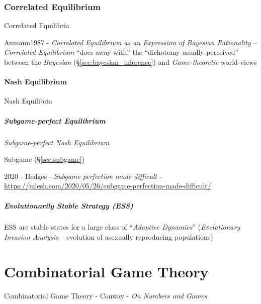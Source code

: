 \subsubsection{Correlated Equilibrium}\label{sec:correlated_equilibrium}

Correlated Equilibria

Aumann1987 - \emph{Correlated Equilibrium as an Expression of Bayesian
  Rationality} -- \emph{Correlated Equilibrium} ``does away with'' the
``dichotomy usually perceived'' between the \emph{Bayesian}
(\S\ref{sec:bayesian_inference}) and \emph{Game-theoretic} world-views



\paragraph{Nash Equilibrium}\label{sec:nash_equilibrium}\hfill

Nash Equilibria



\subparagraph{Subgame-perfect Equilibrium}\label{sec:subgame_perfect}\hfill

\emph{Subgame-perfect Nash Equilibrium}

Subgame (\S\ref{sec:subgame})

2020 - Hedges - \emph{Subgame perfection made difficult} -
\url{https://julesh.com/2020/05/26/subgame-perfection-made-difficult/}



\subparagraph{Evolutionarily Stable Strategy (ESS)}\label{sec:ess}\hfill

ESS are stable states for a large class of ``\emph{Adaptive Dynamics}''
(\emph{Evolutionary Invasion Analysis} -- evolution of asexually reproducing
populations)




\section{Combinatorial Game Theory}\label{sec:combinatorial_game_theory}

Combinatorial Game Theory - Conway  - \emph{On Numbers and Games}




